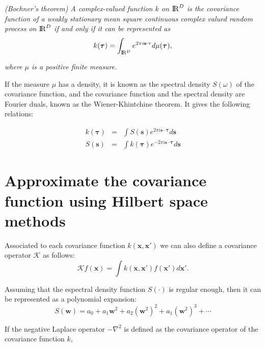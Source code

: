 \documentclass[]{interact}
\theoremstyle{plain}%
\theoremstyle{definition}
\theoremstyle{remark}
\begin{document}
\vspace{0.2cm}
\textit{(Bochner’s theorem) A complex-valued function $k$ on ${\rm I\!R}^D$ is the covariance function of a weakly stationary mean square continuous complex valued random process on ${\rm I\!R}^D$ if and only if it can be represented as}
%
\begin{equation}
k(\boldsymbol{\tau})= \int_{{\rm I\!R}^D} e^{2\pi i \mathbf{s} \cdot \mathbf{\tau}} d\mu(\boldsymbol{\tau}), \nonumber 
\end{equation}

\textit{where $\mu$ is a positive finite measure.} 

\vspace{0.2cm}
If the measure $\mu$ has a density, it is known as the spectral density $S(\omega)$ of the covariance function, and the covariance function and the spectral density are Fourier duals, known as the Wiener-Khintchine theorem. It gives the following relations:

\begin{eqnarray}
k(\boldsymbol{\tau})&=& \int S(\mathbf{s}) e^{2\pi i \mathbf{s} \cdot \boldsymbol{\tau}} d\mathbf{s}  \nonumber \\
%
S(\mathbf{s})&=& \int k(\boldsymbol{\tau}) e^{-2\pi i \mathbf{s} \cdot \boldsymbol{\tau}} d\mathbf{s}  \nonumber
\end{eqnarray}

\section{Approximate the covariance function using Hilbert space methods}

Associated to each covariance function $k(\mathbf{x},\mathbf{x}')$ we can also define a covariance operator $\mathcal{K}$ as follows:
%
\begin{equation}
\mathcal{K} f(\mathbf{x}) = \int k(\mathbf{x},\mathbf{x}') f(\mathbf{x}') d\mathbf{x}'.
\end{equation} 

Assuming that the espectral density function $S(\cdot)$ is regular enough, then it can be represented as a polynomial expansion:
%
\begin{equation}
S(\mathbf{w})=a_0+a_1\mathbf{w}^2+a_2(\mathbf{w}^2)^2+a_1(\mathbf{w}^2)^3+\cdots
\end{equation}


If the negative Laplace operator $-\nabla^2$ is defined as the covariance operator of the covariance function $k$,
\end{document}
